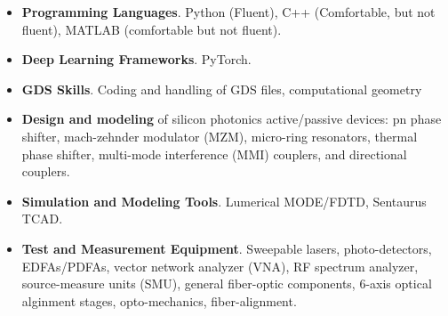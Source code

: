 

\begin{cvparagraph}

\begin{itemize}[leftmargin=*]
    \item \textbf{Programming Languages}. Python (Fluent), C++ (Comfortable, but not fluent), MATLAB (comfortable but not fluent).
    \item \textbf{Deep Learning Frameworks}. PyTorch. 
    \item \textbf{GDS Skills}. Coding and handling of GDS files, computational geometry 
    \item \textbf{Design and modeling} of silicon photonics active/passive devices: pn phase shifter, mach-zehnder modulator (MZM), micro-ring resonators, thermal phase shifter, multi-mode interference (MMI) couplers, and directional couplers. 
    \item \textbf{Simulation and Modeling Tools}. Lumerical MODE/FDTD, Sentaurus TCAD.
    \item \textbf{Test and Measurement Equipment}. Sweepable lasers, photo-detectors, EDFAs/PDFAs, vector network analyzer (VNA), RF spectrum analyzer, source-measure units (SMU), general fiber-optic components, 6-axis optical alginment stages, opto-mechanics, fiber-alignment.
\end{itemize}

\end{cvparagraph}
